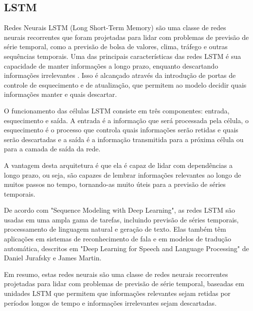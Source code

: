 \subsection{LSTM}

Redes Neurais LSTM (Long Short-Term Memory) são uma classe de redes neurais recorrentes que foram projetadas para lidar com problemas de previsão de série temporal, como a previsão de bolsa de valores, clima, tráfego e outras sequências temporais. Uma das principais características das redes LSTM é sua capacidade de manter informações a longo prazo, enquanto descartando informações irrelevantes \cite{lstm-}. Isso é alcançado através da introdução de portas de controle de esquecimento e de atualização, que permitem ao modelo decidir quais informações manter e quais descartar.

O funcionamento das células LSTM consiste em três componentes: entrada, esquecimento e saída. A entrada é a informação que será processada pela célula, o esquecimento é o processo que controla quais informações serão retidas e quais serão descartadas e a saída é a informação transmitida para a próxima célula ou para a camada de saída da rede.

A vantagem desta arquitetura é que ela é capaz de lidar com dependências a longo prazo, ou seja, são capazes de lembrar informações relevantes ao longo de muitos passos no tempo, tornando-as muito úteis para a previsão de séries temporais.

De acordo com "Sequence Modeling with Deep Learning", as redes LSTM são usadas em uma ampla gama de tarefas, incluindo previsão de séries temporais, processamento de linguagem natural e geração de texto. Elas também têm aplicações em sistemas de reconhecimento de fala e em modelos de tradução automática, descritos em "Deep Learning for Speech and Language Processing" de Daniel Jurafsky e James Martin.

Em resumo, estas redes neurais são uma classe de redes neurais recorrentes projetadas para lidar com problemas de previsão de série temporal, baseadas em unidades LSTM que permitem que informações relevantes sejam retidas por períodos longos de tempo e informações irrelevantes sejam descartadas.




